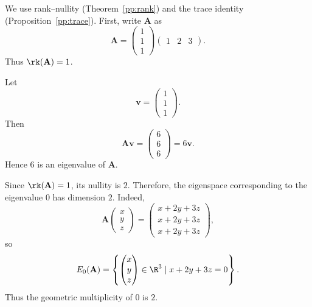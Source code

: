     \begin{solution}
        We use rank--nullity (Theorem~\ref{pp:rank}) and the trace identity (Proposition~\ref{pp:trace}). First, write $\mathbf{A}$ as
        \[
            \mathbf{A}
            =
            \begin{pmatrix}
                1 \\
                1 \\
                1
            \end{pmatrix}
            \begin{pmatrix}
                1 & 2 & 3
            \end{pmatrix}.
        \]
        Thus $\rk(\mathbf{A})=1$.

        Let
        \[
            \mathbf{v}
            =
            \begin{pmatrix}
                1 \\
                1 \\
                1
            \end{pmatrix}.
        \]
        Then
        \[
            \mathbf{A}\mathbf{v}
            =
            \begin{pmatrix}
                6 \\
                6 \\
                6
            \end{pmatrix}
            =
            6\mathbf{v}.
        \]
        Hence $6$ is an eigenvalue of $\mathbf{A}$.

        Since $\rk(\mathbf{A})=1$, its nullity is $2$. Therefore, the eigenspace corresponding to
        the eigenvalue $0$ has dimension $2$. Indeed,
        \[
            \mathbf{A}
            \begin{pmatrix}
                x \\
                y \\
                z
            \end{pmatrix}
            =
            \begin{pmatrix}
                x+2y+3z \\
                x+2y+3z \\
                x+2y+3z
            \end{pmatrix},
        \]
        so
        \[
            E_0(\mathbf{A})
            =
            \left\{
                \begin{pmatrix}
                    x \\
                    y \\
                    z
                \end{pmatrix}
                \in \R^3
                \mid
                x+2y+3z=0
            \right\}.
        \]
        Thus the geometric multiplicity of $0$ is $2$.


\end{solution}
